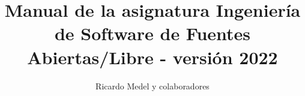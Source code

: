 \documentclass[11pt]{book}
\title{Manual de la asignatura Ingeniería de Software de Fuentes Abiertas/Libre - versión 2022}
\author{Ricardo Medel y colaboradores}
\begin{document}
\date{}
\maketitle

\tableofcontents



















\end{document}
